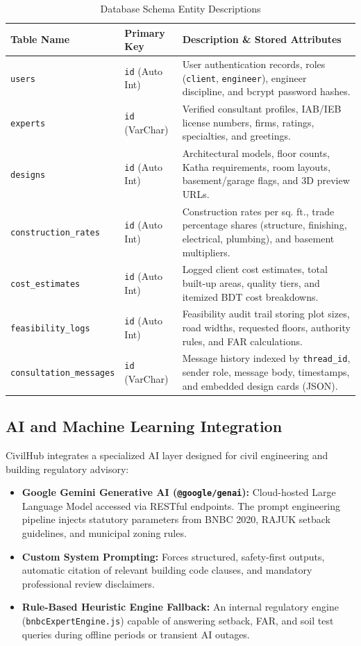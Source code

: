 \documentclass[12pt,a4paper]{article}
\begin{document}
\begin{table}[H]
\centering
\caption{Database Schema Entity Descriptions}
\label{tab:db_schema}
\renewcommand{\arraystretch}{1.2}
\begin{tabularx}{\linewidth}{|p{3.8cm}|p{3.2cm}|X|}
\hline
\textbf{Table Name} & \textbf{Primary Key} & \textbf{Description \& Stored Attributes} \\
\hline
\texttt{users} & \texttt{id} (Auto Int) & User authentication records, roles (\texttt{client}, \texttt{engineer}), engineer discipline, and bcrypt password hashes. \\
\hline
\texttt{experts} & \texttt{id} (VarChar) & Verified consultant profiles, IAB/IEB license numbers, firms, ratings, specialties, and greetings. \\
\hline
\texttt{designs} & \texttt{id} (Auto Int) & Architectural models, floor counts, Katha requirements, room layouts, basement/garage flags, and 3D preview URLs. \\
\hline
\texttt{construction\_rates} & \texttt{id} (Auto Int) & Construction rates per sq. ft., trade percentage shares (structure, finishing, electrical, plumbing), and basement multipliers. \\
\hline
\texttt{cost\_estimates} & \texttt{id} (Auto Int) & Logged client cost estimates, total built-up areas, quality tiers, and itemized BDT cost breakdowns. \\
\hline
\texttt{feasibility\_logs} & \texttt{id} (Auto Int) & Feasibility audit trail storing plot sizes, road widths, requested floors, authority rules, and FAR calculations. \\
\hline
\texttt{consultation\_messages} & \texttt{id} (VarChar) & Message history indexed by \texttt{thread\_id}, sender role, message body, timestamps, and embedded design cards (JSON). \\
\hline
\end{tabularx}
\end{table}

\subsection{AI and Machine Learning Integration}
CivilHub integrates a specialized AI layer designed for civil engineering and building regulatory advisory:
\begin{itemize}
    \item \textbf{Google Gemini Generative AI (\texttt{@google/genai}):} Cloud-hosted Large Language Model accessed via RESTful endpoints. The prompt engineering pipeline injects statutory parameters from BNBC 2020, RAJUK setback guidelines, and municipal zoning rules.
    \item \textbf{Custom System Prompting:} Forces structured, safety-first outputs, automatic citation of relevant building code clauses, and mandatory professional review disclaimers.
    \item \textbf{Rule-Based Heuristic Engine Fallback:} An internal regulatory engine (\texttt{bnbcExpertEngine.js}) capable of answering setback, FAR, and soil test queries during offline periods or transient AI outages.
\end{itemize}
\end{document}
